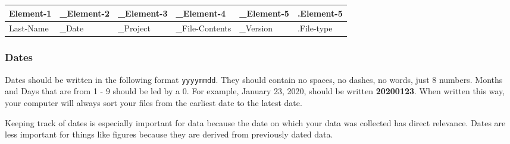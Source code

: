 \documentclass[
]{book}
\newcounter{none} %
\begin{document}
{\def\LTcaptype{none} %
\begin{longtable}[]{@{}
  >{\raggedright\arraybackslash}p{}
  >{\raggedright\arraybackslash}p{}
  >{\raggedright\arraybackslash}p{}
  >{\raggedright\arraybackslash}p{}
  >{\raggedright\arraybackslash}p{}
  >{\raggedright\arraybackslash}p{}@{}}
\toprule\noalign{}
\begin{minipage}[b]{\linewidth}\raggedright
Element-1
\end{minipage} & \begin{minipage}[b]{\linewidth}\raggedright
\_Element-2
\end{minipage} & \begin{minipage}[b]{\linewidth}\raggedright
\_Element-3
\end{minipage} & \begin{minipage}[b]{\linewidth}\raggedright
\_Element-4
\end{minipage} & \begin{minipage}[b]{\linewidth}\raggedright
\_Element-5
\end{minipage} & \begin{minipage}[b]{\linewidth}\raggedright
.Element-5
\end{minipage} \\
\midrule\noalign{}
\endhead
\bottomrule\noalign{}
\endlastfoot
Last-Name & \_Date & \_Project & \_File-Contents & \_Version & .File-type \\
\end{longtable}
}

\subsubsection*{Dates}\label{dates}

Dates should be written in the following format \texttt{yyyymmdd}. They should contain no spaces, no dashes, no words, just 8 numbers. Months and Days that are from 1 - 9 should be led by a 0. For example, January 23, 2020, should be written \textbf{20200123}. When written this way, your computer will always sort your files from the earliest date to the latest date.

Keeping track of dates is especially important for data because the date on which your data was collected has direct relevance. Dates are less important for things like figures because they are derived from previously dated data.
\end{document}
